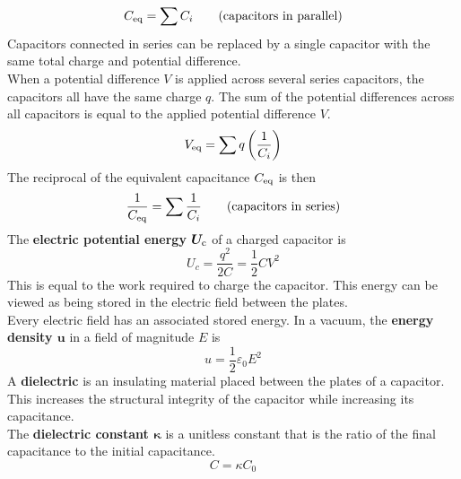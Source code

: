\documentclass[./Electricity and Magnetism.tex]{subfiles}
\begin{document}
			\[C_{\text{eq}} = \sum C_i \tag{capacitors in parallel}\]
		Capacitors connected in series can be replaced by a single capacitor with the same total charge and potential difference. \\
			When a potential difference \(V\) is applied across several series capacitors, the capacitors all have the same charge \(q\). The sum of the potential differences across all capacitors is equal to the applied potential difference \(V\).
			\[V_{\text{eq}} = \sum q\left(\frac{1}{C_i}\right)\]
			The reciprocal of the equivalent capacitance \(C_{\text{eq}}\) is then
			\[\frac{1}{C_{\text{eq}}} = \sum \frac{1}{C_i} \tag{capacitors in series}\]
		The \textbf{electric potential energy \(\bm{U_{\text{c}}}\)} of a charged capacitor is
			\[
				U_c = \frac{q^2}{2C}
					= \frac{1}{2}CV^2
						\tag{potential energy}
			\]
			This is equal to the work required to charge the capacitor. This energy can be viewed as being stored in the electric field between the plates. \\
			Every electric field has an associated stored energy. In a vacuum, the \textbf{energy density \(\bm{u}\)} in a field of magnitude \(E\) is
			\[u = \frac{1}{2}\varepsilon_0E^2 \tag{energy density}\]
		A \textbf{dielectric} is an insulating material placed between the plates of a capacitor. This increases the structural integrity of the capacitor while increasing its capacitance. \\
		The \textbf{dielectric constant \(\bm{\kappa}\)} is a unitless constant that is the ratio of the final capacitance to the initial capacitance.
			\[C = \kappa C_0\]
\end{document}

